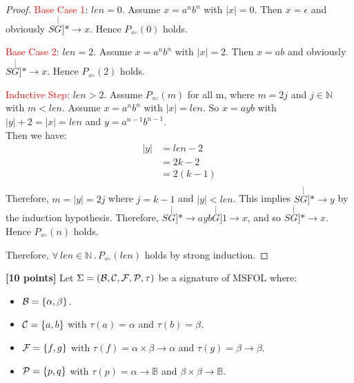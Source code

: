 \documentclass[11pt,fleqn]{article}
\newcommand{\sB}{\mbox{$\cal B$}}
\newcommand{\sC}{\mbox{$\cal C$}}
\newcommand{\sF}{\mbox{$\cal F$}}
\newcommand{\sP}{\mbox{$\cal P$}}
\newcommand{\set}[1]{{\{ #1 \}}}
\newcommand{\ForallApp}{\forall\,}
\newcommand{\mdot}{\mathrel.}
\newcommand{\der}[2]{\stackrel[#2]{#1}{\longrightarrow}}
\begin{document}
\begin{proof}
\textcolor{red}{Base Case 1}: $len = 0$. Assume $x = a^nb^n$ with $|x| = 0$. 
Then $x = \epsilon$ and obviously $S \der{*}{G} x$. 
Hence $P_{\Leftarrow}(0)$ holds.

\textcolor{red}{Base Case 2}: $len = 2$. Assume $x = a^nb^n$ with $|x| = 2$. 
Then $x = ab$ and obviously $S \der{*}{G} x$. 
Hence $P_{\Leftarrow}(2)$ holds.

\textcolor{red}{Inductive Step}: $len > 2$. Assume $P_{\Leftarrow}(m)$ for all m, 
where $m = 2j$ and $j \in \mathbb{N}$ with $m < len$. 
Assume $x = a^nb^n$ with $|x| = len$.  So $x = ayb$ with $|y| + 2 = |x| = len$ and $y = a^{n-1}b^{n-1}$. \\
Then we have:
\begin{align}
|y| &= len - 2  \tag*{$|y| + 2 = len$; arithmetic} \\
  &= 2k - 2 \tag*{$len = 2k$} \\
  &= 2(k - 1) \tag*{Arithmetic} \\
\end{align}
Therefore, $m = |y| = 2j$ where $j = k - 1$ and $|y| < len$.
This implies $S \der{*}{G} y$ by the induction hypothesis. 
Therefore, $S \der{*}{G} ayb \der{1}{G} x$, and so $S \der{*}{G} x$.  
Hence $P_{\Leftarrow}(n)$ holds. 

Therefore, $\ForallApp len \in \mathbb{N} \mdot P_{\Leftarrow}(len)$
holds by strong induction.
\end{proof}

  \newpage

  \item \textbf{[10 points]} Let $\Sigma = (\sB,\sC,\sF,\sP,\tau)$ be
    a signature of MSFOL where:

  \begin{itemize}

    \item[] $\sB = \set{\alpha,\beta}$.

    \item[] $\sC = \set{a,b}$ with $\tau(a) = \alpha$ and $\tau(b) = \beta$.

    \item[] $\sF = \set{f,g}$ with $\tau(f) = \alpha \times \beta
      \rightarrow \alpha$ and $\tau(g) = \beta
      \rightarrow \beta$.

    \item[] $\sP = \set{p,q}$ with $\tau(p) = \alpha \rightarrow
      \mathbb{B}$ and $\beta \times \beta \rightarrow \mathbb{B}$.

  \end{itemize}
\end{document}

